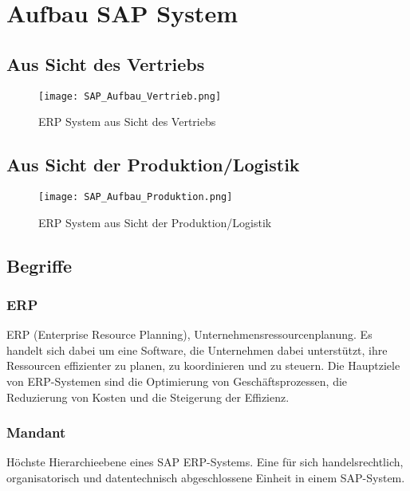 \documentclass[asp2.tex]{subfiles}
\begin{document}
\section{Aufbau SAP System}

\subsection{Aus Sicht des Vertriebs}

\begin{figure}[H]
    \begin{center}
        \texttt{[image: SAP\_Aufbau\_Vertrieb.png]}
    \end{center}
    \caption{ERP System aus Sicht des Vertriebs}
\end{figure}

\subsection{Aus Sicht der Produktion/Logistik}

\begin{figure}[H]
    \begin{center}
        \texttt{[image: SAP\_Aufbau\_Produktion.png]}
    \end{center}
    \caption{ERP System aus Sicht der Produktion/Logistik}
\end{figure}

\subsection{Begriffe}

\subsubsection{ERP}

ERP (Enterprise Resource Planning), Unternehmensressourcenplanung. 
Es handelt sich dabei um eine Software, die Unternehmen dabei unterstützt, 
ihre Ressourcen effizienter zu planen, zu koordinieren und zu steuern. 
Die Hauptziele von ERP-Systemen sind die Optimierung von Geschäftsprozessen, 
die Reduzierung von Kosten und die Steigerung der Effizienz.

\subsubsection{Mandant}

\begin{outline}
    \1 Höchste Hierarchieebene eines SAP ERP-Systems.
    \1 Eine für sich handelsrechtlich, organisatorisch und datentechnisch abgeschlossene Einheit in einem SAP-System. 
\end{outline}
\end{document}
